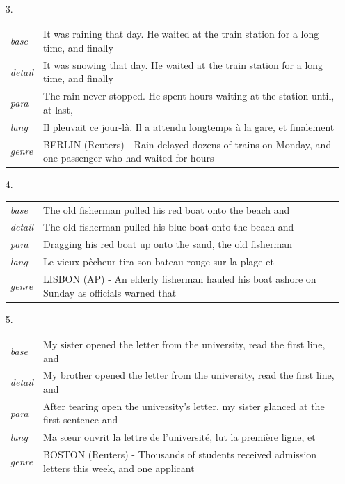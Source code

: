 \documentclass[11pt]{article}
\theoremstyle{definition}
\theoremstyle{remark}
\begin{document}
{\begin{itemize}
\item[3.] \begin{tabular}[t]{@{}ll@{}}\emph{base} & \parbox[t]{0.78\linewidth}{It was raining that day. He waited at the train station for a long time, and finally}\\\emph{detail} & \parbox[t]{0.78\linewidth}{It was snowing that day. He waited at the train station for a long time, and finally}\\\emph{para} & \parbox[t]{0.78\linewidth}{The rain never stopped. He spent hours waiting at the station until, at last,}\\\emph{lang} & \parbox[t]{0.78\linewidth}{Il pleuvait ce jour-là. Il a attendu longtemps à la gare, et finalement}\\\emph{genre} & \parbox[t]{0.78\linewidth}{BERLIN (Reuters) - Rain delayed dozens of trains on Monday, and one passenger who had waited for hours}\\\end{tabular}
\item[4.] \begin{tabular}[t]{@{}ll@{}}\emph{base} & \parbox[t]{0.78\linewidth}{The old fisherman pulled his red boat onto the beach and}\\\emph{detail} & \parbox[t]{0.78\linewidth}{The old fisherman pulled his blue boat onto the beach and}\\\emph{para} & \parbox[t]{0.78\linewidth}{Dragging his red boat up onto the sand, the old fisherman}\\\emph{lang} & \parbox[t]{0.78\linewidth}{Le vieux pêcheur tira son bateau rouge sur la plage et}\\\emph{genre} & \parbox[t]{0.78\linewidth}{LISBON (AP) - An elderly fisherman hauled his boat ashore on Sunday as officials warned that}\\\end{tabular}
\item[5.] \begin{tabular}[t]{@{}ll@{}}\emph{base} & \parbox[t]{0.78\linewidth}{My sister opened the letter from the university, read the first line, and}\\\emph{detail} & \parbox[t]{0.78\linewidth}{My brother opened the letter from the university, read the first line, and}\\\emph{para} & \parbox[t]{0.78\linewidth}{After tearing open the university's letter, my sister glanced at the first sentence and}\\\emph{lang} & \parbox[t]{0.78\linewidth}{Ma sœur ouvrit la lettre de l'université, lut la première ligne, et}\\\emph{genre} & \parbox[t]{0.78\linewidth}{BOSTON (Reuters) - Thousands of students received admission letters this week, and one applicant}\\\end{tabular}

\end{itemize}}
\end{document}

